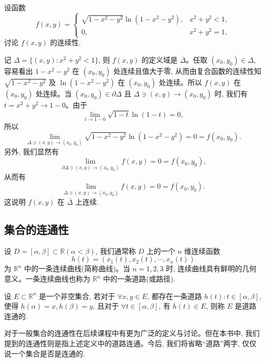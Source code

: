 \begin{example}\label{example:ma-13-3-2}
设函数
\[
  f(x,y)=
  \begin{cases}
    \sqrt{1-x^2-y^2}\ln(1-x^2-y^2), & x^2+y^2<1,\\
    0, & x^2+y^2=1,
  \end{cases}
\]
讨论 $f(x,y)$ 的连续性.
\end{example}


\begin{solve}
记 $\Delta=\{(x,y):x^2+y^2<1\}$, 则 $f(x,y)$ 的定义域是 $\overline\Delta$。任取 $(x_0,y_0)\in\Delta$, 容易看出 $1-x^2-y^2$ 在 $(x_0,y_0)$ 处连续且值大于零, 从而由复合函数的连续性知 $\sqrt{1-x^2-y^2}$ 及 $\ln(1-x^2-y^2)$ 在 $(x_0,y_0)$ 处连续。所以 $f(x,y)$ 在 $(x_0,y_0)$ 处连续。当 $(x_0,y_0)\in\partial\Delta$ 且 $\Delta\ni(x,y)\to(x_0,y_0)$ 时, 我们有 $t=x^2+y^2\to1-0$。由于
\[
  \lim_{t\to1-0}\sqrt{1-t}\ln(1-t)=0,
\]
所以
\[
  \lim_{\Delta\ni(x,y)\to(x_0,y_0)}
  \sqrt{1-x^2-y^2}\ln(1-x^2-y^2)=0=f(x_0,y_0).
\]
另外, 我们显然有
\[
  \lim_{\partial\Delta\ni(x,y)\to(x_0,y_0)}f(x,y)=0=f(x_0,y_0),
\]
从而有
\[
  \lim_{\overline\Delta\ni(x,y)\to(x_0,y_0)}f(x,y)=0=f(x_0,y_0).
\]
这说明 $f(x,y)$ 在 $\overline\Delta$ 上连续.
\end{solve}


\subsection{集合的连通性}
\label{subsec:ma-13-3-3}

设 $D=[\alpha,\beta]\subset\mathbb R(\alpha<\beta)$, 我们通常称 $D$ 上的一个 $n$ 维连续函数
\[
  h(t)=(x_1(t),x_2(t),\cdots,x_n(t))
\]
为 $\mathbb R^n$ 中的一条连续曲线(简称曲线)。当 $n=1,2,3$ 时, 连续曲线具有鲜明的几何意义。一条连续曲线也称为 $\mathbb R^n$ 中的一条道路(或路径).

\begin{definition}\label{definition:ma-13-3-3}
设 $E\subset\mathbb R^n$ 是一个非空集合, 若对于 $\forall x,y\in E$, 都存在一条道路 $h(t):t\in[\alpha,\beta]$, 使得 $h(\alpha)=x,h(\beta)=y$, 且对于 $\forall t\in[\alpha,\beta]$, 有 $h(t)\in E$, 则称 $E$ 是道路连通的.
\end{definition}


\begin{remark}\label{remark:ma-13-source-68}
对于一般集合的连通性在后续课程中有更为广泛的定义与讨论。但在本书中, 我们提到的连通性则是指上述定义中的道路连通。今后, 我们将省略``道路''两字, 仅仅说一个集合是否是连通的.
\end{remark}

